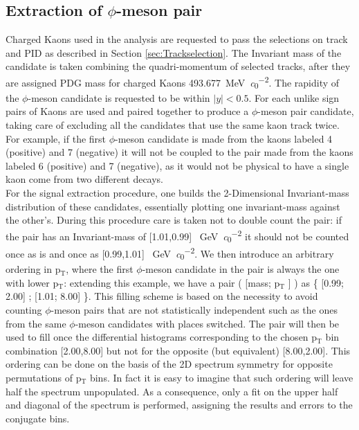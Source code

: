 \subsection{Extraction of $\phi$-meson pair}
Charged Kaons used in the analysis are requested to pass the selections on track and PID as described in Section \ref{sec:Trackselection}. The Invariant mass of the candidate is taken combining the quadri-momentum of selected tracks, after they are assigned PDG mass for charged Kaons \SI{493.677}{\mega\electronvolt\per\clight\squared}\cite{PDG}. The rapidity of the $\phi$-meson candidate is requested to be within $|y| < 0.5$. For each unlike sign pairs of Kaons are used and paired together to produce a $\phi$-meson pair candidate, taking care of excluding all the candidates that use the same kaon track twice. For example, if the first $\phi$-meson candidate is made from the kaons labeled 4 (positive) and 7 (negative) it will not be coupled to the pair made from the kaons labeled 6 (positive) and 7 (negative), as it would not be physical to have a single kaon come from two different decays.\\
\indent For the signal extraction procedure, one builds the 2-Dimensional Invariant-mass distribution of these candidates, essentially plotting one invariant-mass against the other's. During this procedure care is taken not to double count the pair: if the pair has an Invariant-mass of [1.01,0.99] \SI{}{\giga\electronvolt\per\clight\squared} it should not be counted once as is and once as [0.99,1.01] \SI{}{\giga\electronvolt\per\clight\squared}. We then introduce an arbitrary ordering in p$_{\text{T}}$, where the first $\phi$-meson candidate in the pair is always the one with lower p$_{\text{T}}$: extending this example, we have a pair ( [mass; p$_{\text{T}}$ ] ) as  \{ [0.99; 2.00]  ; [1.01; 8.00] \}. This filling scheme is based on the necessity to avoid counting $\phi$-meson pairs that are not statistically independent such as the ones from the same $\phi$-meson candidates with places switched. The pair will then be used to fill once the differential histograms corresponding to the chosen p$_{\text{T}}$ bin combination [2.00,8.00] but not for the opposite (but equivalent) [8.00,2.00]. This ordering can be done on the basis of the 2D spectrum symmetry for opposite permutations of p$_{\text{T}}$ bins. In fact it is easy to imagine that such ordering will leave half the spectrum unpopulated. As a consequence, only a fit on the upper half and diagonal of the spectrum is performed, assigning the results and errors to the conjugate bins.\\
